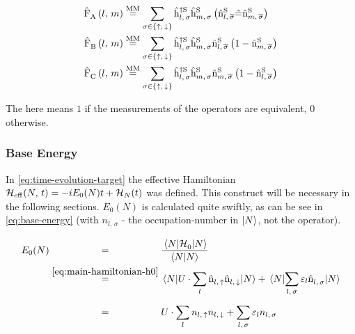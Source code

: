 \begin{equation}
    \label{eq:interaction-picture-v-ham-parts-simplified}
    \begin{split}
        \VhamiltonianOperatorPart{A}{l}{m} &\stackrel{\text{MM}}{=} 
        \lsum[\sigma \in \left\{\up,\,\down\right\}]
        \withspinhcop[\schroedingerPicture]{l}{\sigma}{\dagger}\withspinhcop[\schroedingerPicture]{m}{\sigma}{}
        \left(\nop[\schroedingerPicture]{l}{\overline{\sigma}}
            \equivalentOperator 
            \nop[\schroedingerPicture]{m}{\overline{\sigma}}
        \right)
        \\
        \VhamiltonianOperatorPart{B}{l}{m} &\stackrel{\text{MM}}{=} 
        \lsum[\sigma \in \left\{\up,\,\down\right\}]        
        \withspinhcop[\schroedingerPicture]{l}{\sigma}{\dagger}\withspinhcop[\schroedingerPicture]{m}{\sigma}{}
        \nop[\schroedingerPicture]{l}{\overline{\sigma}}
        \left(
            1 - \nop[\schroedingerPicture]{m}{\overline{\sigma}}
        \right)
        \\
        \VhamiltonianOperatorPart{C}{l}{m} &\stackrel{\text{MM}}{=} 
        \lsum[\sigma \in \left\{\up,\,\down\right\}]
        \withspinhcop[\schroedingerPicture]{l}{\sigma}{\dagger}\withspinhcop[\schroedingerPicture]{m}{\sigma}{}
        \nop[\schroedingerPicture]{m}{\overline{\sigma}}
        \left(
           1 - \nop[\schroedingerPicture]{l}{\overline{\sigma}}
        \right)
        \\
    \end{split}
\end{equation}

The \equivalentOperator here means \glqq $1$ if the measurements of the operators are equivalent, $0$ otherwise\grqq.

\subsubsection*{Base Energy}

In \autoref{eq:time-evolution-target} the effective Hamiltonian ${\mathcal{H}_\text{eff}}^{}({N},\,t) = -i E_0(N) t + \mathcal{H}_{N}(t)$ was defined.
This construct will be necessary in the following sections. 
$E_0(N)$ is calculated quite swiftly, as can be see in \autoref{eq:base-energy} (with $n_{l,\,\sigma}$ - the occupation-number in $\ket{N}$, not the operator).

\begin{equation}
    \label{eq:base-energy}
    \begin{split}
        E_0(N) &\stackrel{\phantom{\ref{eq:main-hamiltonian-h0}}}{=} \frac{\bracketHelper{N}{\HzeroHamiltonian[]}{N}}{\braketHelper{N}{N}} \\
        &\stackrel{\ref{eq:main-hamiltonian-h0}}{=} \bracketHelper{N}{U \cdot \lsum \nop{l}{\up}\nop{l}{\down}}{N} + \bracketHelper{N}{\lsum[l,\,\sigma] \epsl \nop{l}{\sigma}}{N}\\
        &\stackrel{\phantom{\ref{eq:main-hamiltonian-h0}}}{=} U \cdot \lsum n_{l,\,\up}n_{l,\,\down} + \lsum[l,\,\sigma] \epsl n_{l,\,\sigma}
    \end{split}
\end{equation}

